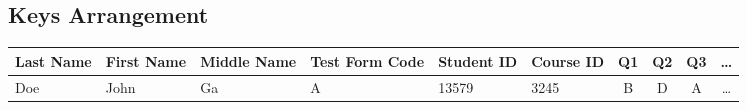 \documentclass[12pt, letterpaper]{report}
\begin{document}
\begin{appendices}
\subsection{Keys Arrangement}
\label{sect:keysarrangement}
\begin{center}
  \begin{tabular}{ l | l | l | l | l | l | c | c | c | c }
    Last Name & First Name & Middle Name & Test Form Code & Student ID & Course ID & Q1 & Q2 & Q3 & \ldots \\
    \hline
    Doe & John & Ga & A & 13579 & 3245 & B & D & A & \ldots
  \end{tabular}
\end{center} 
\end{appendices}
\end{document}
